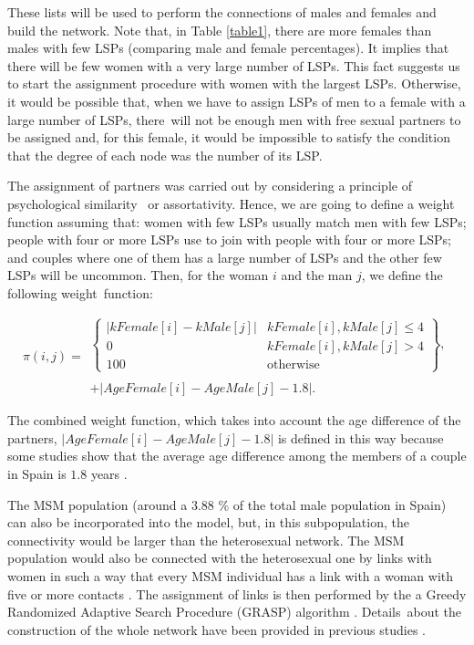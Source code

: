 These lists will be used to perform the connections of males and females and build the network.
Note that, in Table \ref{table1}, there are more females than males with few LSPs (comparing male and female percentages). It implies that there will be few women with a very large number of LSPs. This fact suggests us to start the assignment procedure with women with the largest LSPs. Otherwise, it would be possible that, when we have to assign LSPs of men to a female with a large number of LSPs, there~will not be enough men with free sexual partners to be assigned and, for this female, it would be impossible to satisfy the condition that the degree of each node was the number of its LSP. 

The assignment of partners was carried out by considering a principle of psychological similarity~\cite{PPS} or assortativity.
Hence, we are going to define a weight function assuming that: women with few LSPs usually match men with few LSPs; people with four or more LSPs use to join with people with four or more LSPs; and couples where one of them has a large number of LSPs and the other few LSPs will be uncommon. Then, for the woman $i$ and the man $j$, we define the following weight~function:

\begin{equation}
\pi(i,j) = 
\begin{array}{l}
\left\lbrace \begin{array}{lc}
| kFemale[i] - kMale[j] | & kFemale[i], kMale[j] \le 4 \\
0 & kFemale[i], kMale[j] > 4 \\
100 & \mbox{otherwise}
\end{array} \right\rbrace, \\
\\
 + | AgeFemale[i] - AgeMale[j] - 1.8 |.
\end{array}
\label{peso}
\end{equation}

The combined weight function, which takes into account the age difference of the partners, $\vert AgeFemale[i] - AgeMale[j] - 1.8 \vert$ is defined in this way because some studies show that the average age difference among the members of a couple in Spain is $1.8$ years \cite{Miret}. 

The MSM population (around a $3.88$ \% of the total male population in Spain) can also be incorporated into the model, but, in this subpopulation, the connectivity would be larger than the heterosexual network.
The MSM population would also be connected with the heterosexual one by links with women in such a way that every MSM individual has a link with a woman with five or more contacts \cite{Calibrate}. The assignment of links is then performed by the {a Greedy Randomized Adaptive Search Procedure (GRASP)} algorithm 
\cite{greedy,FeoResende}. Details~about the construction of the whole network have been provided in previous studies \cite{Calibrate,Network}. 

